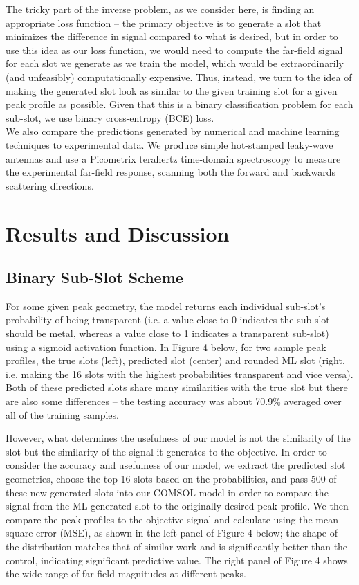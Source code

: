 \documentclass[11pt]{article}
\begin{document}
\noindent The tricky part of the inverse problem, as we consider here, is finding an appropriate loss function -- the primary objective is to generate a slot that minimizes the difference in signal compared to what is desired, but in order to use this idea as our loss function, we would need to compute the far-field signal for each slot we generate as we train the model, which would be extraordinarily (and unfeasibly) computationally expensive. Thus, instead, we turn to the idea of making the generated slot look as similar to the given training slot for a given peak profile as possible. Given that this is a binary classification problem for each sub-slot, we use binary cross-entropy (BCE) loss. \\

\noindent We also compare the predictions generated by numerical and machine learning techniques to experimental data. We produce simple hot-stamped leaky-wave antennas \cite{Guerboukha:21} and use a Picometrix terahertz time-domain spectroscopy to measure the experimental far-field response, scanning both the forward and backwards scattering directions.


\section*{Results and Discussion}
\subsection*{Binary Sub-Slot Scheme}
For some given peak geometry, the model returns each individual sub-slot's probability of being transparent (i.e. a value close to 0 indicates the sub-slot should be metal, whereas a value close to 1 indicates a transparent sub-slot) using a sigmoid activation function. In Figure 4 below, for two sample peak profiles, the true slots (left), predicted slot (center) and rounded ML slot (right, i.e. making the 16 slots with the highest probabilities transparent and vice versa). Both of these predicted slots share many similarities with the true slot but there are also some differences -- the testing accuracy was about 70.9\% averaged over all of the training samples. 

\noindent However, what determines the usefulness of our model is not the similarity of the slot but the similarity of the signal it generates to the objective. In order to consider the accuracy and usefulness of our model, we extract the predicted slot geometries, choose the top 16 slots based on the probabilities, and pass 500 of these new generated slots into our COMSOL model in order to compare the signal from the ML-generated slot to the originally desired peak profile. We then compare the peak profiles to the objective signal and calculate using the mean square error (MSE), as shown in the left panel of Figure 4 below; the shape of the distribution matches that of similar work \cite{Nadell:19} and is significantly better than the control, indicating significant predictive value. The right panel of Figure 4 shows the wide range of far-field magnitudes at different peaks.
\end{document}
